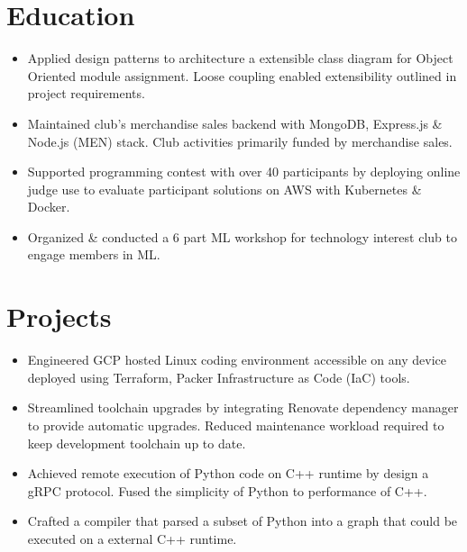 \section{Education}
\begin{itemize}
  \item Applied design patterns to architecture a extensible class diagram for Object Oriented module assignment. Loose coupling enabled extensibility outlined in project requirements.
  \item Maintained club's merchandise sales backend with MongoDB, Express.js \& Node.js (MEN) stack. Club activities primarily funded by merchandise sales.
\end{itemize}
\begin{itemize}
  \item Supported programming contest with over 40 participants by deploying online judge use to evaluate participant solutions on AWS with Kubernetes \& Docker.
  \item Organized \& conducted a 6 part ML workshop for technology interest club to engage members in ML.
\end{itemize}

\section{Projects}
\begin{itemize}
  \item Engineered GCP hosted Linux coding environment accessible on any device deployed using Terraform,
    Packer Infrastructure as Code (IaC) tools.
  \item Streamlined toolchain upgrades by integrating Renovate dependency manager to provide automatic upgrades. Reduced maintenance workload required to keep development toolchain up to date.
\end{itemize}
\begin{itemize}
\item Achieved remote execution of Python code on C++ runtime by design a gRPC protocol. Fused the simplicity of Python to performance of C++.
\item Crafted a compiler that parsed a subset of Python into a graph that could be executed on a external C++ runtime.
\end{itemize}
  
